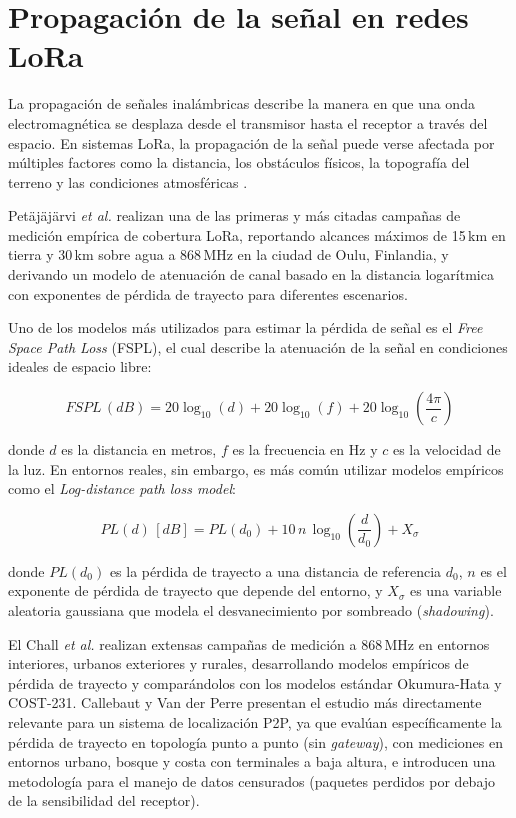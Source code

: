 \section{Propagación de la señal en redes LoRa}
\label{sec:propagacion}

La propagación de señales inalámbricas describe la manera en que una onda electromagnética se desplaza desde el transmisor hasta el receptor a través del espacio. En sistemas LoRa, la propagación de la señal puede verse afectada por múltiples factores como la distancia, los obstáculos físicos, la topografía del terreno y las condiciones atmosféricas \cite{petajajarvi2015coverage}.

Petäjäjärvi \textit{et al.} \cite{petajajarvi2015coverage} realizan una de las primeras y más citadas campañas de medición empírica de cobertura LoRa, reportando alcances máximos de 15\,km en tierra y 30\,km sobre agua a 868\,MHz en la ciudad de Oulu, Finlandia, y derivando un modelo de atenuación de canal basado en la distancia logarítmica con exponentes de pérdida de trayecto para diferentes escenarios.

Uno de los modelos más utilizados para estimar la pérdida de señal es el \textit{Free Space Path Loss} (FSPL), el cual describe la atenuación de la señal en condiciones ideales de espacio libre:

\begin{equation}
    FSPL\,(dB) = 20\log_{10}(d) + 20\log_{10}(f) + 20\log_{10}\left(\frac{4\pi}{c}\right)
    \label{eq:fspl}
\end{equation}

\noindent donde $d$ es la distancia en metros, $f$ es la frecuencia en Hz y $c$ es la velocidad de la luz. En entornos reales, sin embargo, es más común utilizar modelos empíricos como el \textit{Log-distance path loss model}:

\begin{equation}
    PL(d)\,[dB] = PL(d_0) + 10\,n\,\log_{10}\left(\frac{d}{d_0}\right) + X_\sigma
    \label{eq:logdistance}
\end{equation}

\noindent donde $PL(d_0)$ es la pérdida de trayecto a una distancia de referencia $d_0$, $n$ es el exponente de pérdida de trayecto que depende del entorno, y $X_\sigma$ es una variable aleatoria gaussiana que modela el desvanecimiento por sombreado (\textit{shadowing}).

El Chall \textit{et al.} \cite{elchall2019propagation} realizan extensas campañas de medición a 868\,MHz en entornos interiores, urbanos exteriores y rurales, desarrollando modelos empíricos de pérdida de trayecto y comparándolos con los modelos estándar Okumura-Hata y COST-231. Callebaut y Van der Perre \cite{callebaut2020p2p} presentan el estudio más directamente relevante para un sistema de localización P2P, ya que evalúan específicamente la pérdida de trayecto en topología punto a punto (sin \textit{gateway}), con mediciones en entornos urbano, bosque y costa con terminales a baja altura, e introducen una metodología para el manejo de datos censurados (paquetes perdidos por debajo de la sensibilidad del receptor).

